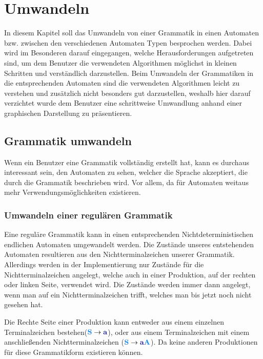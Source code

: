 

\chapter{Umwandeln}\label{ConverTo}

In diesem Kapitel soll das Umwandeln von einer Grammatik in einen Automaten
bzw. zwischen den verschiedenen Automaten Typen besprochen werden. Dabei wird
im Besonderen darauf eingegangen, welche Herausforderungen aufgetreten sind, um
dem Benutzer die verwendeten Algorithmen möglichst in kleinen Schritten und
verständlich darzustellen. Beim Umwandeln der Grammatiken in die entsprechenden
Automaten sind die verwendeten Algorithmen leicht zu verstehen und zusätzlich
nicht besonders gut darzustellen, weshalb hier darauf verzichtet wurde dem
Benutzer eine schrittweise Umwandlung anhand einer graphischen Darstellung zu
präsentieren.


\section{Grammatik umwandeln}

Wenn ein Benutzer eine Grammatik vollständig erstellt hat, kann es durchaus
interessant sein, den Automaten zu sehen, welcher die Sprache akzeptiert, die
durch die Grammatik beschrieben wird. Vor allem, da für Automaten weitaus mehr
Verwendungsmöglichkeiten existieren. 

\subsection{Umwandeln einer regulären Grammatik}

Eine reguläre Grammatik kann in einen entsprechenden Nichtdeterministischen
endlichen Automaten umgewandelt werden. Die Zustände unseres entstehenden
Automaten resultieren aus den Nichtterminalzeichen unserer Grammatik. Allerdings
werden in der Implementierung nur Zustände für die Nichtterminalzeichen angelegt,
welche auch in einer Produktion, auf der rechten oder linken Seite, verwendet
wird. Die Zustände werden immer dann angelegt, wenn man auf ein
Nichtterminalzeichen trifft, welches man bis jetzt noch nicht gesehen
hat.\vspace{10pt}

Die Rechte Seite einer Produktion kann entweder aus einem einzelnen
Terminalzeichen bestehen($\NonterminalSymbol{S} \to \TerminalSymbol{a}$), oder
aus einem Terminalzeichen mit einem anschließenden Nichtterminalzeichen
($\NonterminalSymbol{S} \to \TerminalSymbol{a}\NonterminalSymbol{A}$). Da keine
anderen Produktionen für diese Grammatikform existieren können.\vspace{10pt}

